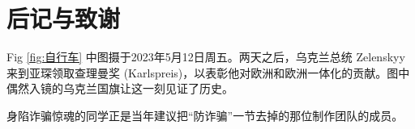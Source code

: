 
\chapter*{后记与致谢}


  Fig \ref{fig:自行车} 中图摄于2023年5月12日周五。两天之后，乌克兰总统 Zelenskyy 来到亚琛领取查理曼奖 (Karlspreis)，以表彰他对欧洲和欧洲一体化的贡献。图中偶然入镜的乌克兰国旗让这一刻见证了历史。

  身陷诈骗惊魂的同学正是当年建议把``防诈骗''一节去掉的那位制作团队的成员。
